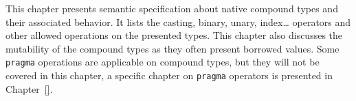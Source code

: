 \documentclass[a4paper,11pt]{book}
\begin{document}
This chapter presents semantic specification about native compound types and
their associated behavior. It lists the casting, binary, unary, index\ldots
operators and other allowed operations on the presented types. This chapter also
discusses the mutability of the compound types as they often present borrowed
values. Some \texttt{pragma} operations are applicable on compound types, but
they will not be covered in this chapter, a specific chapter on \texttt{pragma}
operators is presented in Chapter~\ref{}.

\begin{multicols}{2}
  \minitoc%
  
\end{multicols}
\end{document}
